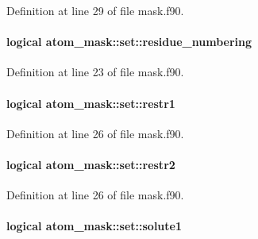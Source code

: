 Definition at line 29 of file mask.\-f90.

\hypertarget{structatom__mask_1_1set_a0e682873dd673d765df9afbecc804ffc}{
\paragraph[{residue\-\_\-numbering}]{\setlength{\rightskip}{0pt plus 5cm}logical atom\-\_\-mask\-::set\-::residue\-\_\-numbering\hspace{0.3cm}{\ttfamily [private]}}}\label{structatom__mask_1_1set_a0e682873dd673d765df9afbecc804ffc}


Definition at line 23 of file mask.\-f90.

\hypertarget{structatom__mask_1_1set_a2c4b759191a51cb32d81a6f5bacb885f}{
\paragraph[{restr1}]{\setlength{\rightskip}{0pt plus 5cm}logical atom\-\_\-mask\-::set\-::restr1\hspace{0.3cm}{\ttfamily [private]}}}\label{structatom__mask_1_1set_a2c4b759191a51cb32d81a6f5bacb885f}


Definition at line 26 of file mask.\-f90.

\hypertarget{structatom__mask_1_1set_ac51adab800a7dbb658901f599b56ab32}{
\paragraph[{restr2}]{\setlength{\rightskip}{0pt plus 5cm}logical atom\-\_\-mask\-::set\-::restr2\hspace{0.3cm}{\ttfamily [private]}}}\label{structatom__mask_1_1set_ac51adab800a7dbb658901f599b56ab32}


Definition at line 26 of file mask.\-f90.

\hypertarget{structatom__mask_1_1set_a34a813030a81c7629f614624b2e6f33e}{
\paragraph[{solute1}]{\setlength{\rightskip}{0pt plus 5cm}logical atom\-\_\-mask\-::set\-::solute1\hspace{0.3cm}{\ttfamily [private]}}}\label{structatom__mask_1_1set_a34a813030a81c7629f614624b2e6f33e}


